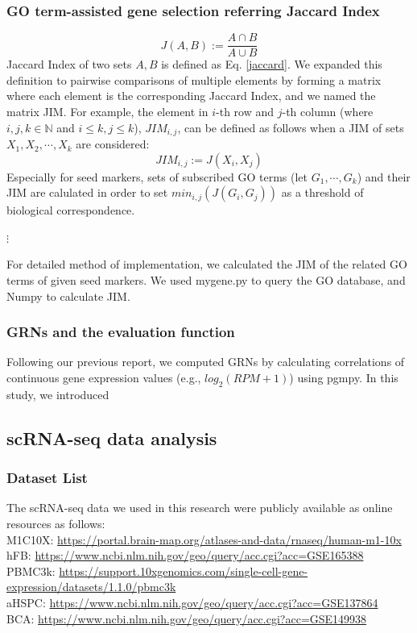 \documentclass{article}
\begin{document}
\subsubsection*{GO term-assisted gene selection referring Jaccard Index}
\begin{equation}\label{jaccard}
  J(A, B) := \frac{A\cap B}{A\cup B}
\end{equation}
Jaccard Index of two sets $A, B$ is defined as Eq. \eqref{jaccard}. We expanded this 
definition to pairwise comparisons of multiple elements by forming a matrix 
where each element is the corresponding Jaccard Index, and we named the matrix \ac{JIM}. For example, the element in 
$i$-th row and $j$-th column (where $i, j, k\in\mathbb{N}$ and $i\leq k, j\leq k$), $JIM_{i,j}$, can be defined as
follows when a JIM of sets $X_1, X_2,\cdots, X_k$ are considered:
\begin{equation}\label{jim}
  JIM_{i, j} := J(X_i, X_j)
\end{equation}
Especially for seed markers, sets of subscribed GO terms (let $G_1, \cdots, G_k$)
and their JIM are calulated in order to set $min_{i,j}(J(G_i, G_j))$ as a threshold of 
biological correspondence.

$\vdots$

For detailed method of implementation, we calculated the JIM of the related GO terms of given seed markers. We used mygene.py\cite{mygene} to query the GO database, and Numpy\cite{numpy} to calculate JIM.

\subsubsection*{GRNs and the evaluation function}
Following our previous report\cite{okano2023set}, we computed GRNs by calculating
correlations of continuous gene expression values (e.g., $log_2(RPM+1)$) using pgmpy. In this study, we introduced

\subsection*{scRNA-seq data analysis}
\subsubsection*{Dataset List}
The scRNA-seq data we used in this research were publicly available as online
resources as follows:\\
M1C10X: \url{https://portal.brain-map.org/atlases-and-data/rnaseq/human-m1-10x}\\
hFB: \url{https://www.ncbi.nlm.nih.gov/geo/query/acc.cgi?acc=GSE165388}\\
PBMC3k: \url{https://support.10xgenomics.com/single-cell-gene-expression/datasets/1.1.0/pbmc3k}\\
aHSPC: \url{https://www.ncbi.nlm.nih.gov/geo/query/acc.cgi?acc=GSE137864}\\
BCA: \url{https://www.ncbi.nlm.nih.gov/geo/query/acc.cgi?acc=GSE149938}
\end{document}

